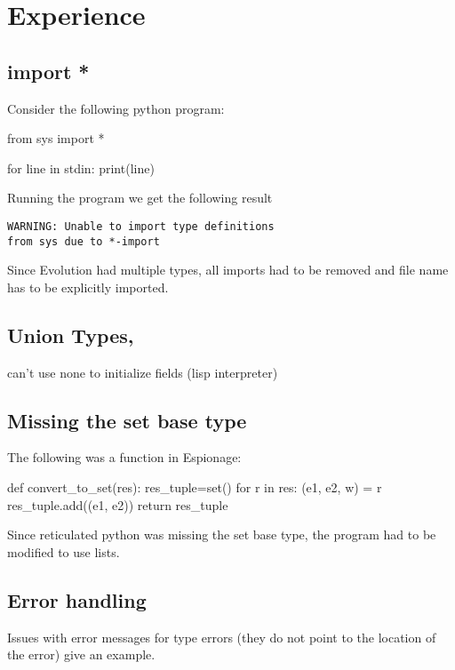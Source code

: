 \section{Experience}


\subsection{import * }

Consider the following python program:

\begin{python}
from sys import *

for line in stdin:
    print(line)
\end{python}

Running the program we get the following result

\begin{verbatim}
WARNING: Unable to import type definitions
from sys due to *-import
\end{verbatim}

    Since Evolution had multiple types, all \pythoninline{*} imports had to be removed
    and file name has to be explicitly imported. 
    

 \subsection{Union Types,}
 can't use none to initialize fields (lisp interpreter)

    
\subsection{ Missing the set base type}
 The following was a function in Espionage:

 \begin{python}
 def convert_to_set(res):
    res_tuple=set()
    for r in res:
        (e1, e2, w) = r
        res_tuple.add((e1, e2))
    return res_tuple
 \end{python}
 
    Since reticulated python was missing the set base type, the program had to
    be modified to use lists.


 \subsection{Error handling}   
Issues with error messages for type errors (they do not point to the location of the error)
give an example. 



